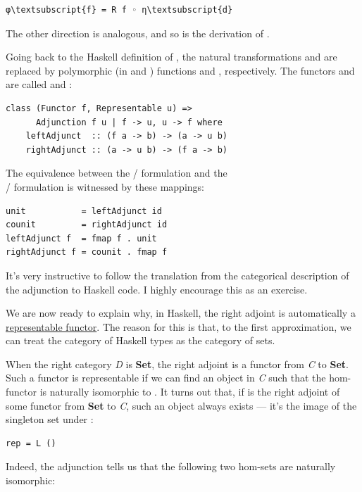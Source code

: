 \begin{Verbatim}[commandchars=\\\{\}]
φ\textsubscript{f} = R f ◦ η\textsubscript{d}
\end{Verbatim}
The other direction is analogous, and so is the derivation of
.

Going back to the Haskell definition of , the natural
transformations  and  are replaced by polymorphic
(in  and ) functions  and
, respectively. The functors  and
 are called  and :

\begin{verbatim}
class (Functor f, Representable u) => 
      Adjunction f u | f -> u, u -> f where
    leftAdjunct  :: (f a -> b) -> (a -> u b)
    rightAdjunct :: (a -> u b) -> (f a -> b) 
\end{verbatim}
The equivalence between the / formulation
and the\\ / formulation is
witnessed by these mappings:

\begin{verbatim}
unit           = leftAdjunct id
counit         = rightAdjunct id
leftAdjunct f  = fmap f . unit
rightAdjunct f = counit . fmap f 
\end{verbatim}
It's very instructive to follow the translation from the categorical
description of the adjunction to Haskell code. I highly encourage this
as an exercise.

We are now ready to explain why, in Haskell, the right adjoint is
automatically a \hyperref[representable-functors]{representable
functor}. The reason for this is that, to the first approximation, we
can treat the category of Haskell types as the category of sets.

When the right category \emph{D} is \textbf{Set}, the right adjoint
 is a functor from \emph{C} to \textbf{Set}. Such a functor is
representable if we can find an object  in \emph{C} such
that the hom-functor  is naturally isomorphic to
. It turns out that, if  is the right adjoint of
some functor  from \textbf{Set} to \emph{C}, such an object
always exists --- it's the image of the singleton set \code{()} under
:

\begin{verbatim}
rep = L ()
\end{verbatim}
Indeed, the adjunction tells us that the following two hom-sets are
naturally isomorphic:

